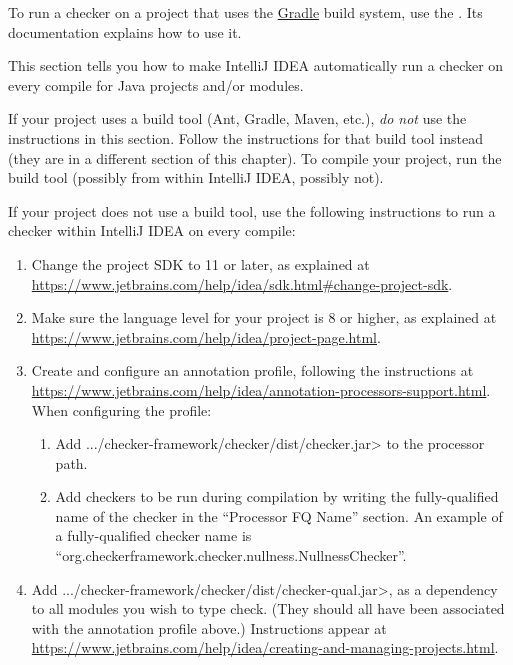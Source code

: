To run a checker
on a project that uses the \href{https://gradle.org/}{Gradle} build system,
use the
.  Its documentation explains how to use it.




This section tells you how to make IntelliJ IDEA automatically run a
checker on every compile for Java projects and/or modules.

If your project uses a build tool (Ant, Gradle, Maven, etc.), \emph{do not}
use the instructions in this section.
Follow the instructions for that build tool instead (they are in
a different section of this chapter).  To compile your project, run the
build tool (possibly from within IntelliJ IDEA, possibly not).



If your project does not use a build tool, use the following instructions
to run a checker within IntelliJ IDEA on every compile:

\begin{enumerate}

\item Change the project SDK to 11 or later, as explained at
  \url{https://www.jetbrains.com/help/idea/sdk.html#change-project-sdk}.

\item Make sure the language level for your project is 8 or higher, as explained at
\url{https://www.jetbrains.com/help/idea/project-page.html}.

\item Create and configure an annotation profile, following the instructions at \url{https://www.jetbrains.com/help/idea/annotation-processors-support.html}.
When configuring the profile:
\begin{enumerate}
\item Add \<.../checker-framework/checker/dist/checker.jar> to the processor path.
\item Add checkers to be run during compilation by writing the
  fully-qualified name of the checker in the ``Processor FQ Name''
  section.  An example of a fully-qualified checker name is
  ``org.checkerframework.checker.nullness.NullnessChecker''.
\end{enumerate}

\item Add \<.../checker-framework/checker/dist/checker-qual.jar>, as a dependency to all
modules you wish to type check. (They should all have been associated with
the annotation profile above.)
Instructions appear at
\url{https://www.jetbrains.com/help/idea/creating-and-managing-projects.html}.

\end{enumerate}


